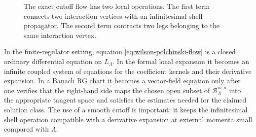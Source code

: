 \begin{figure}[H]
{
  }
  \caption{The exact cutoff flow has two local operations.  The first term
  connects two interaction vertices with an infinitesimal shell propagator.
  The second term contracts two legs belonging to the same interaction
  vertex.}
  \label{fig:wilson-polchinski-diagrams}
\end{figure}

In the finite-regulator setting, equation
\eqref{eq:wilson-polchinski-flow} is a closed ordinary differential equation
on \(L_\Lambda\).  In the formal local expansion it becomes an infinite
coupled system of equations for the coefficient kernels and their derivative
expansion.  In a Banach RG chart it becomes a vector-field equation only after
one verifies that the right-hand side maps the chosen open subset of
\(\mathcal B_{\Lambda}^{m,a}\) into the appropriate tangent space and satisfies
the estimates needed for the claimed solution class.  The use of a smooth
cutoff is important: it keeps the infinitesimal shell operation compatible
with a derivative expansion at external momenta small compared with
\(\Lambda\).

